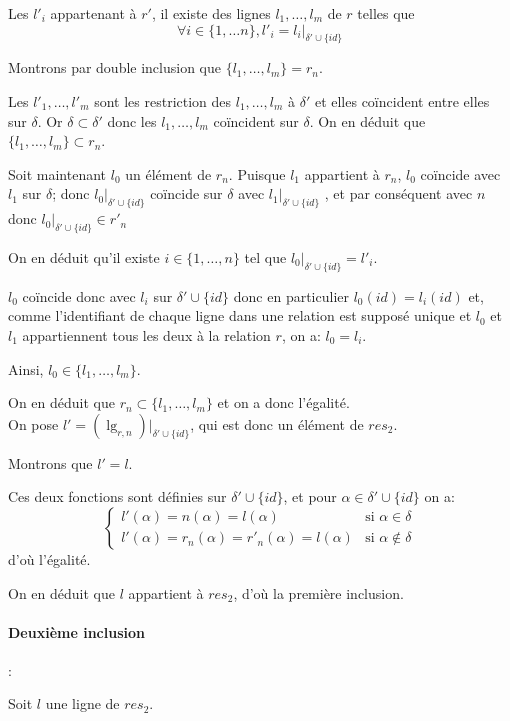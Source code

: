 \documentclass[french]{article}
\DeclareMathOperator{\lgr}{lg}
\newcommand{\cip}{\cup \{id\}}
\begin{document}
Les $l'_i$ appartenant à $r'$,
il existe des lignes $l_1, \dots, l_m$
de $r$ telles que 
$$
\forall i \in \{1, \dots n \},
l'_i = l_i|_{\delta' \cip}
$$

Montrons par double inclusion que $\{ l_1, \dots, l_m \} = r_n$.

Les $l'_1, \dots, l'_m$ sont les restriction des 
$l_1, \dots, l_m$  à $\delta'$ et elles coïncident entre elles
sur $\delta$.
Or $\delta \subset \delta'$ donc les
$l_1, \dots, l_m$ coïncident sur $\delta$.
On en déduit que $\{ l_1, \dots, l_m \} \subset r_n$.

Soit maintenant $l_0$ un élément de $r_n$.
Puisque $l_1$ appartient à $r_n$,
$l_0$ coïncide avec $l_1$ sur $\delta$;
donc $l_0|_{\delta' \cip}$ coïncide sur $\delta$ avec 
$l_1|_{\delta' \cip}$ , et par conséquent avec $n$
donc $l_0|_{ \delta' \cip } \in r'_n$ 

On en déduit qu'il existe $i \in \{1, \dots, n\}$
tel que $l_0|_{\delta' \cip} = l'_i$.

$l_0$ coïncide donc avec $l_i$ sur $\delta' \cip$
donc en particulier $l_0(id) = l_i(id)$ et,
comme l'identifiant de chaque ligne dans une relation est supposé unique
et $l_0$ et $l_1$ appartiennent tous les deux à la relation $r$,
on a: $l_0 = l_i$.

Ainsi, $l_0 \in \{l_1, \dots, l_m\}$.

On en déduit que $r_n \subset \{ l_1, \dots, l_m \}$
et on a donc l'égalité. \\

On pose $l' = (\lgr_{r, n})|_{\delta' \cip }$,
qui est donc un élément de $res_2$.

Montrons que $l' = l$.

Ces deux fonctions sont définies
sur $\delta' \cip$, et pour $\alpha \in \delta' \cip$ on a:
$$
\left\lbrace
\begin{array}{ll}
l'(\alpha) = n(\alpha) = l(\alpha)
& \text{si $\alpha \in \delta$} \\
l' (\alpha) = r_n(\alpha) = r'_n(\alpha) = l(\alpha)
& \text{si $\alpha \notin \delta$}
\end{array}
\right.
$$
d'où l'égalité.

On en déduit que $l$ appartient à $res_2$, d'où la première inclusion.

\paragraph*{Deuxième inclusion} :

Soit $l$ une ligne de $res_2$.
\end{document}
